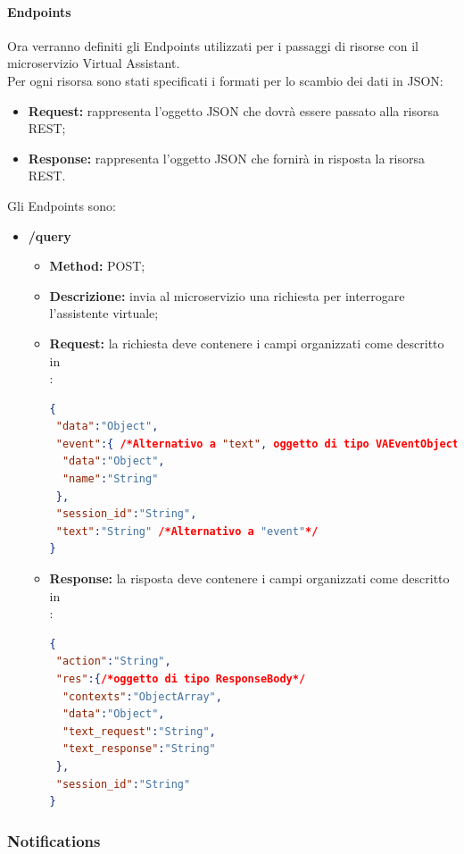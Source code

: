 \paragraph{Endpoints}

Ora verranno definiti gli Endpoints utilizzati per i passaggi di risorse con il microservizio Virtual Assistant.\\
Per ogni risorsa sono stati specificati i formati per lo scambio dei dati in JSON: 
\begin{itemize}
\item \textbf{Request:} rappresenta l’oggetto JSON che dovrà essere passato alla risorsa REST;
\item \textbf{Response:} rappresenta l’oggetto JSON che fornirà in risposta la risorsa REST.
\end{itemize}
Gli Endpoints sono: 
\begin{itemize}
\item \textbf{/query}\\
\begin{itemize}
\item \textbf{Method:} POST;
\item \textbf{Descrizione:} invia al microservizio una richiesta per interrogare l'assistente virtuale;
\item \textbf{Request:} la richiesta deve contenere i campi organizzati come descritto in \\:
\begin{lstlisting}[language=json,firstnumber=1]
{
 "data":"Object",
 "event":{ /*Alternativo a "text", oggetto di tipo VAEventObject*/
  "data":"Object",
  "name":"String"
 },
 "session_id":"String",
 "text":"String" /*Alternativo a "event"*/
}
\end{lstlisting}
\item \textbf{Response:} la risposta deve contenere i campi organizzati come descritto in \\:
\begin{lstlisting}[language=json,firstnumber=1]
{
 "action":"String",
 "res":{/*oggetto di tipo ResponseBody*/
  "contexts":"ObjectArray",
  "data":"Object",
  "text_request":"String",
  "text_response":"String"
 },
 "session_id":"String"
}
\end{lstlisting}
\end{itemize}
\end{itemize}


\subsubsection{Notifications}
